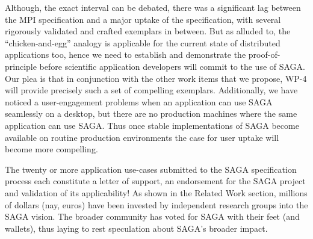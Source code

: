 \documentclass[10pt,letterpaper]{article}
\begin{document}

Although, the exact interval can be debated, there was a significant
lag between the MPI specification and a major uptake of the
specification, with several rigorously validated and crafted exemplars
in between.  But as alluded to, the ``chicken-and-egg'' analogy is
applicable for the current state of distributed applications too,
hence we need to establish and demonstrate the proof-of-principle
before scientific application developers will commit to the use of
SAGA.  Our plea is that in conjunction with the other work
items that we propose, WP-4 will provide precisely such a set of
compelling exemplars.
Additionally, we have noticed a user-engagement problems when
an application can use SAGA seamlessly on a desktop, but there are no
production machines where the same application can use SAGA. Thus once
stable implementations of SAGA become available on routine production
environments the case for user uptake will become more compelling.

 The twenty or more
application use-cases submitted to the SAGA specification process each
constitute a letter of support, an endorsement for the SAGA project
and validation of its applicability!  As shown in the Related
Work section, millions of dollars (nay, euros) have been invested by
independent research groups into the SAGA vision. The broader
community has voted for SAGA with their feet (and wallets), thus
laying to rest speculation about SAGA's broader impact.
\end{document}
